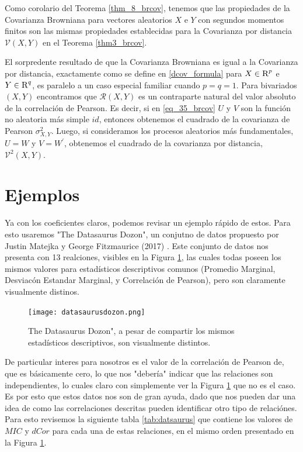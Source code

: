 	Como corolario del Teorema \ref{thm_8_brcov}, tenemos que las propiedades de la Covarianza Browniana para vectores aleatorios $X$ e $Y$ con segundos momentos finitos son las mismas propiedades establecidas para la Covarianza por distancia $\mathcal{V}(X, Y)$ en el Teorema \ref{thm3_brcov}.
	
	El sorpredente resultado de que la Covarianza Browniana es igual a la Covarianza por distancia, exactamente como se define en \ref{dcov_formula} para $X \in \textsc{R}^p$ e $Y \in \textsc{R}^q$, es paralelo a un caso especial familiar cuando $p=q=1$. Para bivariados $(X, Y)$ encontramos que $\mathcal{R}(X, Y)$ es un contraparte natural del valor absoluto de la correlaci\'on de Pearson. Es decir, si en \ref{eq_35_brcov} $U$ y $V$ son la funci\'on no aleatoria m\'as simple $id$, entonces obtenemos el cuadrado de la covarianza de Pearson $\sigma_{X, Y}^2$. Luego, si consideramos los procesos aleatorios m\'as fundamentales, $U=W$ y $V=W^{\prime}$, obtenemos el cuadrado de la covarianza por distancia, $\mathcal{V}^2(X, Y)$.


    \section{Ejemplos}

    Ya con los coeficientes claros, podemos revisar un ejemplo r\'apido de estos. Para esto usaremos "The Datasaurus Dozon", un conjutno de datos propuesto por Justin Matejka y George Fitzmaurice (2017) \cite{datasaurus}. Este conjunto de datos nos presenta con 13 realciones, visibles en la Figura \ref{datasaurus_fig}, las cuales todas poseen los mismos valores para estad\'isticos descriptivos comunos (Promedio Marginal, Desviac\'on Estandar Marginal, y Correlaci\'on de Pearson), pero son claramente visualmente distinos.

    \begin{figure}[H] 
        \centering
        \texttt{[image: datasaurusdozon.png]}
        \caption{The Datasaurus Dozon", a pesar de compartir los mismos estad\'isticos descriptivos, son visualmente distintos.}
        \label{datasaurus_fig}
    \end{figure}

    De particular interes para nosotros es el valor de la correlaci\'on de Pearson de, que es b\'asicamente cero, lo que nos "deber\'ia" indicar que las relaciones son independientes, lo cuales claro con simplemente ver la Figura \ref{datasaurus_fig} que no es el caso. Es por esto que estos datos nos son de gran ayuda, dado que nos pueden dar una idea de como las correlaciones descritas pueden identificar otro tipo de relaci\'ones. Para esto revisemos la siguiente tabla \ref{tab:datsaurus} que contiene los valores de $MIC$ y $dCor$ para cada una de estas relaciones, en el mismo orden presentado en la Figura \ref{datasaurus_fig}.

